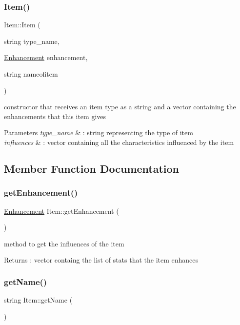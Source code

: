 \subsubsection{\texorpdfstring{Item()}{Item()}}
{\footnotesize\ttfamily Item\+::\+Item (\begin{DoxyParamCaption}\item[{string}]{type\+\_\+name,  }\item[{\hyperlink{class_enhancement}{Enhancement}}]{enhancement,  }\item[{string}]{nameofitem }\end{DoxyParamCaption})}

constructor that receives an item type as a string and a vector containing the enhancements that this item gives 
\begin{DoxyParams}{Parameters}
{\em type\+\_\+name} & \+: string representing the type of item \\
\hline
{\em influences} & \+: vector containing all the characteristics influenced by the item \\
\hline
\end{DoxyParams}


\subsection{Member Function Documentation}
\hypertarget{class_item_a267a70ef319464175269993003c6448d}{}\label{class_item_a267a70ef319464175269993003c6448d} 
\subsubsection{\texorpdfstring{get\+Enhancement()}{getEnhancement()}}
{\footnotesize\ttfamily \hyperlink{class_enhancement}{Enhancement} Item\+::get\+Enhancement (\begin{DoxyParamCaption}{ }\end{DoxyParamCaption})}

method to get the influences of the item \begin{DoxyReturn}{Returns}
\+: vector containg the list of stats that the item enhances 
\end{DoxyReturn}
\hypertarget{class_item_a63d7f2148b699e539aae354b01559811}{}\label{class_item_a63d7f2148b699e539aae354b01559811} 
\subsubsection{\texorpdfstring{get\+Name()}{getName()}}
{\footnotesize\ttfamily string Item\+::get\+Name (\begin{DoxyParamCaption}{ }\end{DoxyParamCaption})}

